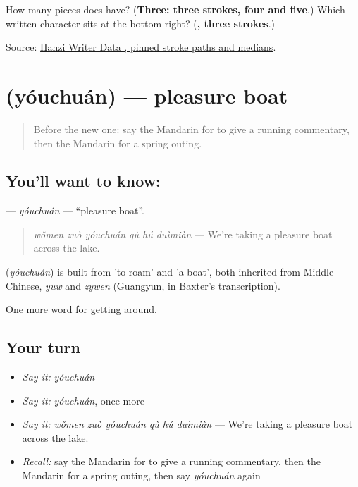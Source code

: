 \begin{tcolorbox}[breakable,colback=teal!4,colframe=teal!35!black,title={Before you move on}]
How many pieces does  have? (\textbf{Three: three strokes, four and five}.) Which written character sits at the bottom right? (\textbf{, three strokes}.)

Source: \href{https://raw.githubusercontent.com/chanind/hanzi-writer-data/68d10a4b21150cae5e1ebbd223eed289cf32d90c/data/\%E6\%B8\%B8.json}{Hanzi Writer Data , pinned stroke paths and medians}.
\end{tcolorbox}
\section[\texorpdfstring{\zh{游船} (yóuchuán)}{游船 (yóuchuán)}]{ (yóuchuán) — pleasure boat}

\label{lesson:ZH-C431-youchuan}



\begin{quote}
Before the new one: say the Mandarin for to give a running commentary, then the Mandarin for a spring outing.
\end{quote}

\subsection*{You'll want to know: }
\textbf{} — \emph{yóuchuán} — \textquotedblleft{}pleasure boat\textquotedblright{}.

\begin{quote}
\emph{wǒmen zuò yóuchuán qù hú duìmiàn} — We're taking a pleasure boat across the lake.
\end{quote}

\begin{cousinweb}
\textbf{} (\emph{yóuchuán}) is built from  'to roam' and  'a boat', both inherited from Middle Chinese, \emph{yuw} and \emph{zywen} (Guangyun, in Baxter's transcription).
\end{cousinweb}

\begin{grammarlens}[title={What you've built}]
One more word for getting around.
\end{grammarlens}

\subsection*{Your turn}
\begin{itemize}
\raggedright
  \item \emph{Say it:} \emph{yóuchuán}
  \item \emph{Say it:} \emph{yóuchuán}, once more
  \item \emph{Say it:} \emph{wǒmen zuò yóuchuán qù hú duìmiàn} — We're taking a pleasure boat across the lake.
  \item \emph{Recall:} say the Mandarin for to give a running commentary, then the Mandarin for a spring outing, then say \emph{yóuchuán} again
\end{itemize}

